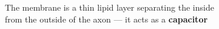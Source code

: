 \documentclass[preview]{standalone}
\begin{document}
\begin{center}
The membrane is a thin lipid layer separating the inside\\from the outside of the axon --- it acts as a \textbf{capacitor}
\end{center}
\end{document}
